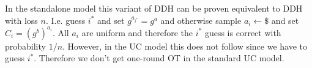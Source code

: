 In the standalone model this variant of DDH can be proven equivalent to DDH with loss $n$. I.e. guess $i^*$ and set $g^{a_{i^*}}=g^a$ and otherwise sample $a_i\gets \$$ and set $C_i=(g^b)^{a_i}$. All $a_i$ are uniform and therefore the $i^*$  guess is correct with probability $1/n$. However, in the UC model this does not follow since we have to guess $i^*$. Therefore we don't get one-round OT in the standard UC model. 
%
%	
%	
%	
%	
%	
%	
%	
%	
%	
%	
%	
